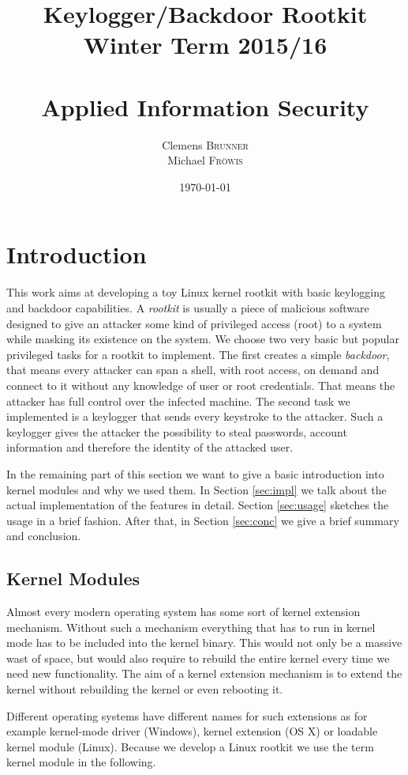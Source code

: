 \documentclass[12pt]{article}
\title{\huge{Keylogger/Backdoor Rootkit} \\\large{Winter Term 2015/16} \\\quad \\\huge{Applied Information Security}}
\author{Clemens \textsc{Brunner}\\
        Michael \textsc{Fröwis}} %
\date{\today} %
\begin{document}
\maketitle %
\thispagestyle{empty}
\newpage
\tableofcontents
\thispagestyle{empty}

\newpage

\section{Introduction}

This work aims at developing a toy Linux kernel rootkit with basic keylogging and backdoor capabilities. A \emph{rootkit} is usually a piece of malicious software designed to give an attacker some kind of privileged access (root) to a system while masking its existence on the system. We choose two very basic but popular privileged tasks for a rootkit to implement. The first creates a simple \emph{backdoor}, that means every attacker can span a shell, with root access, on demand and connect to it without any knowledge of user or root credentials. That means the attacker has full control over the infected machine. The second task we implemented is a keylogger that sends every keystroke to the attacker. Such a keylogger gives the attacker the possibility to steal passwords, account information and therefore the identity of the attacked user.  

In the remaining part of this section we want to give a basic introduction into kernel modules and why we used them. In Section \ref{sec:impl} we talk about the actual implementation of the features in detail. Section \ref{sec:usage} sketches the usage in a brief fashion. After that, in Section \ref{sec:conc} we give a brief summary and conclusion. 


\subsection{Kernel Modules}

Almost every modern operating system has some sort of kernel extension mechanism. Without such a mechanism everything that has to run in kernel mode has to be included into the kernel binary. This would not only be a massive wast of space, but would also require to rebuild the entire kernel every time we need new functionality. The aim of a kernel extension mechanism is to extend the kernel without rebuilding the kernel or even rebooting it. 

Different operating systems have different names for such extensions as for example kernel-mode driver (Windows), kernel extension (OS X) or loadable kernel module (Linux). Because we develop a Linux rootkit we use the term kernel module in the following. 
\end{document}
